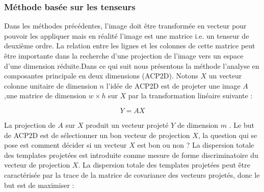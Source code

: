 {\subsubsection{Méthode basée sur les tenseurs }
Dans les méthodes précédentes, l’image doit être transformée en vecteur pour pouvoir les appliquer \citep{wang2006palmprint}mais en réalité l’image est une matrice i.e. un tenseur de deuxième ordre. La relation entre les lignes et les colonnes de cette matrice peut être importante dans la recherche d’une projection de l’image vers un espace d’une dimension réduite\citep{xiao2010novel}.Dans ce qui suit nous présentons la méthode l’analyse en composantes principale en deux dimensions (ACP2D).
Notons $X$ un vecteur colonne unitaire de dimension $n$ l’idée de ACP2D est de projeter une image $A$ ,une matrice de dimension $w\times h$ sur $X$ par la transformation linéaire suivante :
\begin{center}
	\begin{equation}\label{eq:chapitre3eq10}
	Y=AX
	\end{equation}
\end{center}
La projection de $A$ sur $X$  produit un vecteur projeté  $Y$ de dimension $m$ .
Le but de ACP2D est de sélectionner un bon vecteur de projection $X$, la question qui se pose est comment décider si un vecteur $X$ est bon ou non ?
La dispersion totale des templates projetées est introduite comme mesure de forme discriminatoire du vecteur de projection $X$. La dispersion totale des templates projetées peut être caractérisée par la trace de la matrice de covariance des vecteurs projetés, donc le  but est de maximiser :

}

